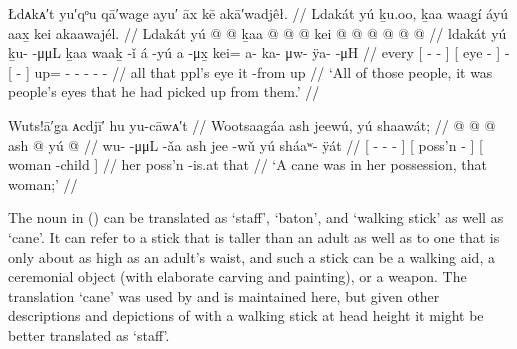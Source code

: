
\ex\label{ex:94-15-picked-up-peoples-eyes}%
%
\begingl
	\glpreamble	Łdᴀkᴀ′t yu′qᵒu qā′wag̣e ayu′ āx kē akā′wadjêł. //
	\glpreamble	Ldakát yú ḵu.oo, ḵaa waag̱í áyú aax̱ kei akaawajél. //
	\gla	Ldakát {} yú  @ {} @ {} {}
		{} ḵaa  @ {} {}
		 @ {}
		{}  @ {} {}
		kei @  @ {} @ {} @ {} @ {} @ {} //
	\glb	ldakát {} yú ḵu-  -μμL {}
		{} ḵaa waaḵ -ǐ {}
		á -yú
		{} a -μx̱ {}
		kei= a- ka- μw- ÿa-  -μH //
	\glc	every {}[  -  - {}]
		{}[  eye - {}]
		 -
		{}[  - {}]
		up= - - - -  - //
	\gld	all {} that  {} {} {}
		{} ppl’s eye {} {}
		 {}
		{} it -from {}
		up\•  {} {} {} {} {} //
	\glft	‘All of those people, it was people’s eyes that he had picked up from them.’
		//
\endgl
\xe


\ex\label{ex:94-16-she-had-a-cane}%
%
\begingl
	\glpreamble	Wuts!ā′g̣a ᴀcdjī′ hu yu-cāwᴀ′t //
	\glpreamble	Wootsaag̱áa ash jeewú, yú shaawát; //
	\gla	{}  @ {} @ {} @ {} {}
		{} ash  @ {} {}
		{} yú  @ {} {} //
	\glb	{} wu-  -μμL -ǎa {}
		{} ash jee -wǔ {}
		{} yú sháaʷ- ÿát {} //
	\glc	{}[ -  - - {}]
		{}[  poss’n - {}]
		{}[  woman -child {}] //
	\gld	{}  {} {} {} {}
		{} her poss’n -is.at {}
		{} that  {} {} //
	\glft	‘A cane was in her possession, that woman;’
		//
\endgl
\xe

The noun  in (\lastx) can be translated as ‘staff’, ‘baton’, and ‘walking stick’ as well as ‘cane’.
It can refer to a stick that is taller than an adult as well as to one that is only about as high as an adult’s waist, and such a stick can be a walking aid, a ceremonial object (with elaborate carving and painting), or a weapon.
The translation ‘cane’ was used by \citeauthor{swanton:1909} and is maintained here, but given other descriptions and depictions of  with a walking stick at head height it might be better translated as ‘staff’.

